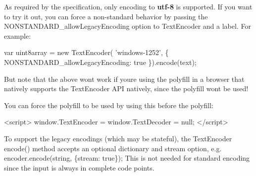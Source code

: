 As required by the specification, only encoding to {\bfseries utf-\/8} is supported. If you want to try it out, you can force a non-\/standard behavior by passing the {\ttfamily N\+O\+N\+S\+T\+A\+N\+D\+A\+R\+D\+\_\+allow\+Legacy\+Encoding} option to Text\+Encoder and a label. For example\+:


\begin{DoxyCode}
var uint8array = new TextEncoder(
  'windows-1252', \{ NONSTANDARD\_allowLegacyEncoding: true \}).encode(text);
\end{DoxyCode}


But note that the above won\textquotesingle{}t work if you\textquotesingle{}re using the polyfill in a browser that natively supports the Text\+Encoder A\+PI natively, since the polyfill won\textquotesingle{}t be used!

You can force the polyfill to be used by using this before the polyfill\+:


\begin{DoxyCode}
<script>
window.TextEncoder = window.TextDecoder = null;
</script>
\end{DoxyCode}


To support the legacy encodings (which may be stateful), the Text\+Encoder {\ttfamily encode()} method accepts an optional dictionary and {\ttfamily stream} option, e.\+g. {\ttfamily encoder.\+encode(string, \{stream\+: true\});} This is not needed for standard encoding since the input is always in complete code points. 
